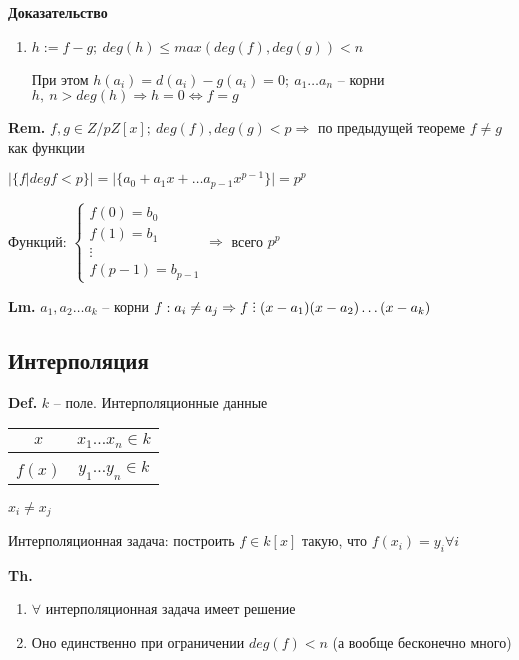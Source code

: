 \documentclass[14pt, letter paper]{article}
\DeclareRobustCommand{\divby}{%
  \mathrel{\text{\vbox{\baselineskip.65ex\lineskiplimit0pt\hbox{.}\hbox{.}\hbox{.}}}}%
}
\begin{document}
\begin{center}
    \textbf{Доказательство}
\end{center}

\begin{enumerate}
    \item $h := f - g;\ deg(h) \leq max(deg(f), deg(g)) < n$

    При этом $h(a_i) = d(a_i) - g(a_i) = 0;\ a_1 \ldots a_n$ -- корни $h,\ n > deg(h) \Rightarrow h = 0 \Leftrightarrow f = g$
\end{enumerate}

\textbf{Rem.} $f, g \in Z/pZ[x];\ deg(f), deg(g) < p \Rightarrow$ по предыдущей теореме $f \neq g$ как функции

$|\{f | deg{f} < p\}| = |\{a_0 + a_1x + \ldots a_{p-1}x^{p-1}\}| = p^p$

Функций: $\begin{cases}
    f(0) = b_0 \\
    f(1) = b_1 \\
    \vdots \\
    f(p-1) = b_{p-1}
\end{cases} \Rightarrow$ всего $p^p$

\textbf{Lm.} $a_1, a_2 \ldots a_k$ -- корни $f : a_i \neq a_j \Rightarrow f \divby (x-a_1)(x-a_2)\ldots(x-a_k)$

\begin{center}
    \section*{Интерполяция}
\end{center}

\textbf{Def.} $k$ -- поле. Интерполяционные данные \begin{tabular}{c|c}
    $x$ & $x_1 \ldots x_n \in k$ \\
    \hline \\
    $f(x)$ & $y_1 \ldots y_n \in k$
\end{tabular} $x_i \neq x_j$

Интерполяционная задача: построить $f \in k[x]$ такую, что $f(x_i) = y_i \forall i$

\vspace{3mm}

\textbf{Th.} \begin{enumerate}
    \item $\forall$ интерполяционная задача имеет решение

    \item Оно единственно при ограничении $deg(f) < n$ (а вообще бесконечно много)
\end{enumerate}
\end{document}
